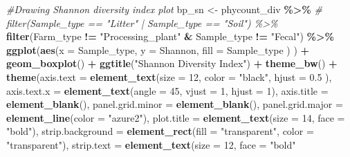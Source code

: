 \documentclass[
]{article}
\newenvironment{Shaded}{\begin{snugshade}}{\end{snugshade}}
\newcommand{\AttributeTok}[1]{\textcolor[rgb]{0.13,0.29,0.53}{#1}}
\newcommand{\CommentTok}[1]{\textcolor[rgb]{0.56,0.35,0.01}{\textit{#1}}}
\newcommand{\DecValTok}[1]{\textcolor[rgb]{0.00,0.00,0.81}{#1}}
\newcommand{\FloatTok}[1]{\textcolor[rgb]{0.00,0.00,0.81}{#1}}
\newcommand{\FunctionTok}[1]{\textcolor[rgb]{0.13,0.29,0.53}{\textbf{#1}}}
\newcommand{\NormalTok}[1]{#1}
\newcommand{\OtherTok}[1]{\textcolor[rgb]{0.56,0.35,0.01}{#1}}
\newcommand{\SpecialCharTok}[1]{\textcolor[rgb]{0.81,0.36,0.00}{\textbf{#1}}}
\newcommand{\StringTok}[1]{\textcolor[rgb]{0.31,0.60,0.02}{#1}}
\begin{document}
\begin{Shaded}
\begin{Highlighting}[]
\CommentTok{\#Drawing Shannon diversity index plot}
\NormalTok{bp\_sn }\OtherTok{\textless{}{-}} 
\NormalTok{    phycount\_div }\SpecialCharTok{\%\textgreater{}\%}
  \CommentTok{\# filter(Sample\_type == "Litter" | Sample\_type == "Soil") \%\textgreater{}\%}
  \FunctionTok{filter}\NormalTok{(Farm\_type }\SpecialCharTok{!=} \StringTok{"Processing\_plant"} \SpecialCharTok{\&}\NormalTok{ Sample\_type }\SpecialCharTok{!=} \StringTok{"Fecal"}\NormalTok{) }\SpecialCharTok{\%\textgreater{}\%}
  \FunctionTok{ggplot}\NormalTok{(}\FunctionTok{aes}\NormalTok{(}\AttributeTok{x =}\NormalTok{ Sample\_type, }
             \AttributeTok{y =}\NormalTok{ Shannon, }
             \AttributeTok{fill =}\NormalTok{ Sample\_type}
\NormalTok{             )}
\NormalTok{         ) }\SpecialCharTok{+}
  \FunctionTok{geom\_boxplot}\NormalTok{() }\SpecialCharTok{+}
  \FunctionTok{ggtitle}\NormalTok{(}\StringTok{"Shannon Diversity Index"}\NormalTok{) }\SpecialCharTok{+}
  \FunctionTok{theme\_bw}\NormalTok{() }\SpecialCharTok{+}
  \FunctionTok{theme}\NormalTok{(}\AttributeTok{axis.text =} \FunctionTok{element\_text}\NormalTok{(}\AttributeTok{size =} \DecValTok{12}\NormalTok{, }
                                 \AttributeTok{color =} \StringTok{"black"}\NormalTok{, }
                                 \AttributeTok{hjust =} \FloatTok{0.5}
\NormalTok{                                   ),}
        \AttributeTok{axis.text.x =} \FunctionTok{element\_text}\NormalTok{(}\AttributeTok{angle =} \DecValTok{45}\NormalTok{,}
                                   \AttributeTok{vjust =} \DecValTok{1}\NormalTok{,}
                                   \AttributeTok{hjust =} \DecValTok{1}\NormalTok{),}
        \AttributeTok{axis.title =} \FunctionTok{element\_blank}\NormalTok{(),}
        \AttributeTok{panel.grid.minor =} \FunctionTok{element\_blank}\NormalTok{(),}
        \AttributeTok{panel.grid.major =} \FunctionTok{element\_line}\NormalTok{(}\AttributeTok{color =} \StringTok{"azure2"}\NormalTok{),}
        \AttributeTok{plot.title =} \FunctionTok{element\_text}\NormalTok{(}\AttributeTok{size =} \DecValTok{14}\NormalTok{, }\AttributeTok{face =} \StringTok{"bold"}\NormalTok{),}
        \AttributeTok{strip.background =} \FunctionTok{element\_rect}\NormalTok{(}\AttributeTok{fill =} \StringTok{"transparent"}\NormalTok{,}
                                        \AttributeTok{color =} \StringTok{"transparent"}\NormalTok{),}
        \AttributeTok{strip.text =} \FunctionTok{element\_text}\NormalTok{(}\AttributeTok{size =} \DecValTok{12}\NormalTok{,}
                                  \AttributeTok{face =} \StringTok{"bold"}

\end{Highlighting}
\end{Shaded}
\end{document}
